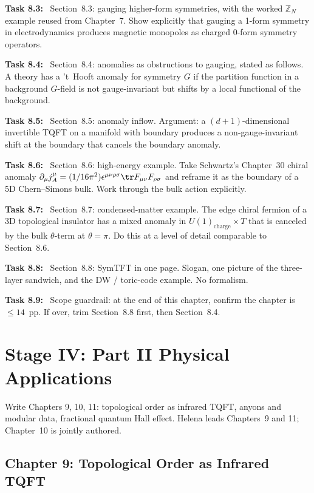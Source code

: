 \documentclass[11pt]{article}
\newcommand{\task}[1]{\medskip\noindent\textbf{Task #1:}\ }
\begin{document}
\task{8.3} Section~8.3: gauging higher-form symmetries, with the worked $\mathbb{Z}_N$
example reused from Chapter~7. Show explicitly that gauging a 1-form symmetry in
electrodynamics produces magnetic monopoles as charged 0-form symmetry operators.

\task{8.4} Section~8.4: anomalies as obstructions to gauging, stated as follows.
A theory has a 't~Hooft anomaly for symmetry $G$ if the partition function in a
background $G$-field is not gauge-invariant but shifts by a local functional of
the background.

\task{8.5} Section~8.5: anomaly inflow.
Argument: a $(d+1)$-dimensional invertible TQFT on a manifold with boundary produces a
non-gauge-invariant shift at the boundary that cancels the boundary anomaly.

\task{8.6} Section~8.6: high-energy example. Take Schwartz's Chapter~30 chiral anomaly
$\partial_\mu j^\mu_A = (1/16\pi^2)\epsilon^{\mu\nu\rho\sigma}\tr F_{\mu\nu}F_{\rho\sigma}$
and reframe it as the boundary of a 5D Chern--Simons bulk. Work through the bulk action
explicitly.

\task{8.7} Section~8.7: condensed-matter example. The edge chiral fermion of a 3D
topological insulator has a mixed anomaly in $U(1)_{\text{charge}}\times T$ that is
canceled by the bulk $\theta$-term at $\theta=\pi$. Do this at a level of detail
comparable to Section~8.6.

\task{8.8} Section~8.8: SymTFT in one page. Slogan, one picture of the three-layer
sandwich, and the DW / toric-code example. No formalism.

\task{8.9} Scope guardrail: at the end of this chapter, confirm the chapter is
$\le 14$~pp. If over, trim Section~8.8 first, then Section~8.4.

\section{Stage IV: Part II Physical Applications}\label{sec:stageIV}

\begin{goalbox}[Objective]
Write Chapters 9, 10, 11: topological order as infrared TQFT, anyons and modular data,
fractional quantum Hall effect. Helena leads Chapters~9 and 11; Chapter~10 is jointly
authored.
\end{goalbox}

\subsection{Chapter 9: Topological Order as Infrared TQFT}
\end{document}
